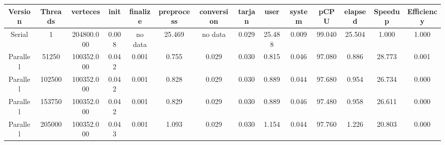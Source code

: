 \begin{tabular}{|c|c|c|c|c|c|c|c|c|c|c|c|c|c|}
\toprule
 Version &  Threads &   verteces &  init & finalize &  preprocess & conversion &  tarjan &   user &  system &   pCPU &  elapsed &  Speedup &  Efficiency \\
\midrule
  Serial &        1 & 204800.000 & 0.008 &  no data &      25.469 &    no data &   0.029 & 25.488 &   0.009 & 99.040 &   25.504 &    1.000 &       1.000 \\
Parallel &    51250 & 100352.000 & 0.042 &    0.001 &       0.755 &      0.029 &   0.030 &  0.815 &   0.046 & 97.080 &    0.886 &   28.773 &       0.001 \\
Parallel &   102500 & 100352.000 & 0.042 &    0.001 &       0.828 &      0.029 &   0.030 &  0.889 &   0.044 & 97.680 &    0.954 &   26.734 &       0.000 \\
Parallel &   153750 & 100352.000 & 0.042 &    0.001 &       0.829 &      0.029 &   0.030 &  0.889 &   0.046 & 97.480 &    0.958 &   26.611 &       0.000 \\
Parallel &   205000 & 100352.000 & 0.043 &    0.001 &       1.093 &      0.029 &   0.030 &  1.154 &   0.044 & 97.760 &    1.226 &   20.803 &       0.000 \\
\bottomrule
\end{tabular}
